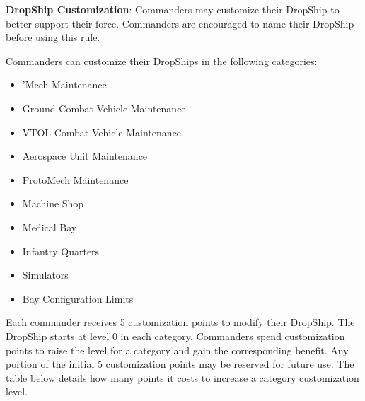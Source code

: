 \item {\bfseries DropShip Customization}: Commanders may customize their DropShip to better support their force.
Commanders are encouraged to name their DropShip before using this rule.

Commanders can customize their DropShips in the following categories:


\begin{itemize}

\item 'Mech Maintenance

\item Ground Combat Vehicle Maintenance

\item VTOL Combat Vehicle Maintenance

\item Aerospace Unit Maintenance

\item ProtoMech Maintenance

\item Machine Shop

\item Medical Bay

\item Infantry Quarters

\item Simulators

\item Bay Configuration Limits

\end{itemize}


Each commander receives 5 customization points to modify their DropShip.
The DropShip starts at level 0 in each category.
Commanders spend customization points to raise the level for a category and gain the corresponding benefit.
Any portion of the initial 5 customization points may be reserved for future use.
The table below details how many points it costs to increase a category customization level.

